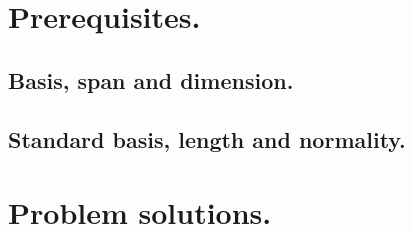 %
%
   \section{Prerequisites.}
      \subsection{Basis, span and dimension.}
      \subsection{Standard basis, length and normality.}
   \section{Problem solutions.}
      \shipoutAnswer
